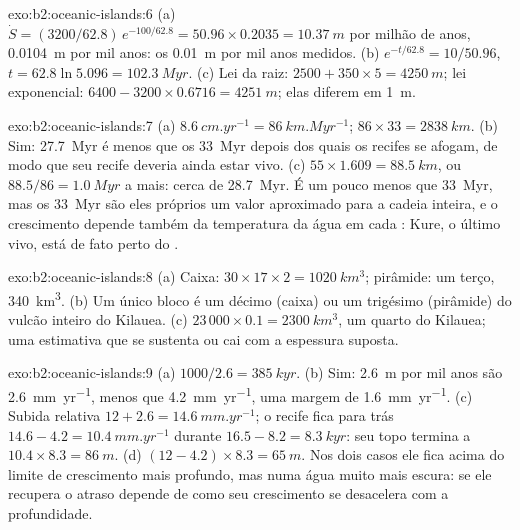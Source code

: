 \begin{solution}{exo:b2:oceanic-islands:6}
(a) $\dot S = (3200/62.8)\,e^{-100/62.8} = 50.96\times0.2035 = \qty{10.37}{m}$ por milhão de anos,
\qty{0.0104}{m} por mil anos: os \qty{0.01}{m} por mil anos medidos. (b) $e^{-t/62.8}
= 10/50.96$, $t = 62.8\ln5.096 = \qty{102.3}{Myr}$. (c) Lei da raiz: $2500 + 350\times5 =
\qty{4250}{m}$; lei exponencial: $6400 - 3200\times0.6716 = \qty{4251}{m}$; elas diferem em
\qty{1}{m}.
\end{solution}

\begin{solution}{exo:b2:oceanic-islands:7}
(a) $\qty{8.6}{cm.yr^{-1}} = \qty{86}{km.Myr^{-1}}$; $86\times33 = \qty{2838}{km}$. (b) Sim:
\qty{27.7}{Myr} é menos que os \qty{33}{Myr} depois dos quais os recifes se afogam, de modo que seu recife deveria
ainda estar vivo. (c) $55\times1.609 = \qty{88.5}{km}$, ou $88.5/86 = \qty{1.0}{Myr}$ a mais: cerca de
\qty{28.7}{Myr}. É um pouco menos que \qty{33}{Myr}, mas os \qty{33}{Myr} são eles próprios um
valor aproximado para a cadeia inteira, e o crescimento depende também da temperatura da água em cada
: Kure, o último  vivo, está de fato perto do .
\end{solution}

\begin{solution}{exo:b2:oceanic-islands:8}
(a) Caixa: $30\times17\times2 = \qty{1020}{km^3}$; pirâmide: um terço, \qty{340}{km^3}. (b) Um único bloco
é um décimo (caixa) ou um trigésimo (pirâmide) do vulcão inteiro do Kilauea. (c) $23\,000\times
0.1 = \qty{2300}{km^3}$, um quarto do Kilauea; uma estimativa que se sustenta ou cai com a espessura
suposta.
\end{solution}

\begin{solution}{exo:b2:oceanic-islands:9}
(a) $1000/2.6 = \qty{385}{kyr}$. (b) Sim: \qty{2.6}{m} por mil anos são
\qty{2.6}{mm.yr^{-1}}, menos que \qty{4.2}{mm.yr^{-1}}, uma margem de \qty{1.6}{mm.yr^{-1}}.
(c) Subida relativa $12 + 2.6 = \qty{14.6}{mm.yr^{-1}}$; o recife fica para trás $14.6 - 4.2 =
\qty{10.4}{mm.yr^{-1}}$ durante $16.5 - 8.2 = \qty{8.3}{kyr}$: seu topo termina a $10.4\times8.3 =
\qty{86}{m}$. (d) $(12 - 4.2)\times8.3 = \qty{65}{m}$. Nos dois casos ele fica acima do limite de crescimento
mais profundo, mas numa água muito mais escura: se ele recupera o atraso depende de como seu crescimento se desacelera com
a profundidade.
\end{solution}

